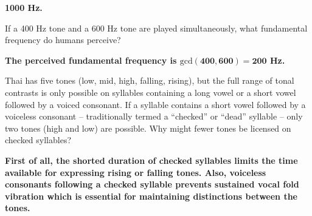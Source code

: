 \documentclass{../../templates/lkx_pset}
\begin{document}
\begin{solution}
  \bfseries
  1000 Hz.
\end{solution}

\begin{problem}{9}
  If a 400 Hz tone and a 600 Hz tone are played simultaneously, what fundamental frequency do humans perceive?
\end{problem}

\begin{solution}
  \bfseries
  The perceived fundamental frequency is $\textrm{gcd}\mathbf{(400,600)=200}$ Hz.
\end{solution}

\begin{problem}{10}
  Thai has five tones (low, mid, high, falling, rising), but the full range of tonal contrasts is only possible on syllables containing a long vowel or a short vowel followed by a voiced consonant. If a syllable contains a short vowel followed by a voiceless consonant -- traditionally termed a ``checked'' or ``dead'' syllable -- only two tones (high and low) are possible. Why might fewer tones be licensed on checked syllables?
\end{problem}

\begin{solution}
  \bfseries
  First of all, the shorted duration of checked syllables limits the time available for expressing rising or falling tones. Also, voiceless consonants following a checked syllable prevents sustained vocal fold vibration which is essential for maintaining distinctions between the tones.
\end{solution}
\end{document}
